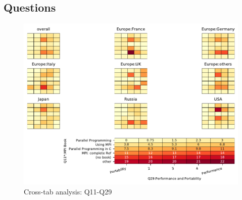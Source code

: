 
\subsection{Questions}


\begin{figure}
\begin{center}
\includegraphics[width=12cm]{../pdfs/Q11-Q29.pdf}
\caption{Cross-tab analysis: Q11-Q29}
\label{fig:Q11-Q29}
\end{center}
\end{figure}
